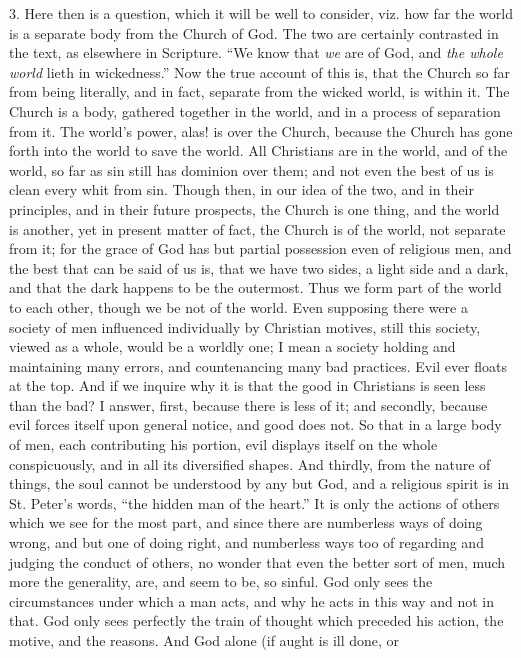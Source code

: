 3. Here then is a question, which it will be well to consider, viz.
how far the world is a separate body from the Church of God. The two
are certainly contrasted in the text, as elsewhere in Scripture.
``We know that \emph{we} are of God, and \emph{the whole world}
lieth in wickedness.'' Now the true account of this is, that the
Church so far from being literally, and in fact, separate from the
wicked world, is within it. The Church is a body, gathered together in
the world, and in a process of separation from it. The world's power,
alas! is over the Church, because the Church has gone forth into the
world to save the world. All Christians are in the world, and of the
world, so far as sin still has dominion over them; and not even the
best of us is clean every whit from sin. Though then, in our idea of
the two, and in their principles, and in their future prospects, the
Church is one thing, and the world is another, yet in present matter
of fact, the Church is of the world, not separate from it; for the
grace of God has but partial possession even of religious men, and the
best that can be said of us is, that we have two sides, a light side
and a dark, and that the dark happens to be the outermost. Thus we
form part of the world to each other, though we be not of the world.
Even supposing there were a society of men influenced individually by
Christian motives, still this society, viewed as a whole, would be a
worldly one; I mean a society holding and maintaining many errors, and
countenancing many bad practices. Evil ever floats at the top. And if
we inquire why it is that the good in Christians is seen less than the
bad? I answer, first, because there is less of it; and secondly, because evil forces itself upon general notice, and good does not. So
that in a large body of men, each contributing his portion, evil
displays itself on the whole conspicuously, and in all its diversified
shapes. And thirdly, from the nature of things, the soul cannot be
understood by any but God, and a religious spirit is in St. Peter's
words, ``the hidden man of the heart.'' It is only the actions
of others which we see for the most part, and since there are
numberless ways of doing wrong, and but one of doing right, and
numberless ways too of regarding and judging the conduct of others, no
wonder that even the better sort of men, much more the generality,
are, and seem to be, so sinful. God only sees the circumstances under
which a man acts, and why he acts in this way and not in that. God
only sees perfectly the train of thought which preceded his action,
the motive, and the reasons. And God alone (if aught is ill done, or
